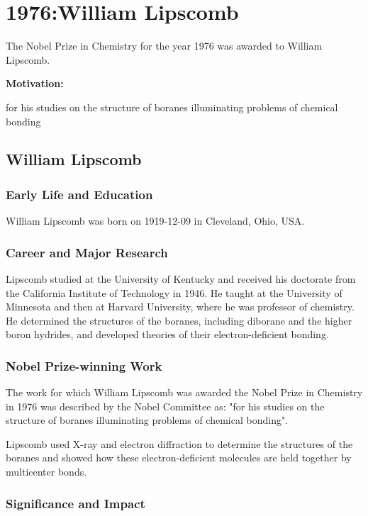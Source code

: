 \chapter{1976:William Lipscomb}

\label{chap:chemistry1976}

The Nobel Prize in Chemistry for the year 1976 was awarded to William Lipscomb.

\textbf{Motivation:}

for his studies on the structure of boranes illuminating problems of chemical bonding

\section{William Lipscomb}

\subsection*{Early Life and Education}

William Lipscomb was born on 1919-12-09 in Cleveland, Ohio, USA.

\subsection*{Career and Major Research}

Lipscomb studied at the University of Kentucky and received his doctorate from the California Institute of Technology in 1946. He taught at the University of Minnesota and then at Harvard University, where he was professor of chemistry. He determined the structures of the boranes, including diborane and the higher boron hydrides, and developed theories of their electron-deficient bonding.

\subsection*{Nobel Prize-winning Work}

The work for which William Lipscomb was awarded the Nobel Prize in Chemistry in 1976 was described by the Nobel Committee as: "for his studies on the structure of boranes illuminating problems of chemical bonding".

Lipscomb used X-ray and electron diffraction to determine the structures of the boranes and showed how these electron-deficient molecules are held together by multicenter bonds.

\subsection*{Significance and Impact}

